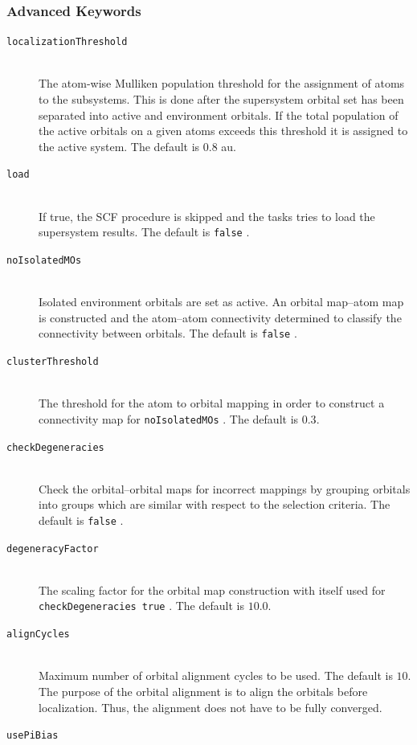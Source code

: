 \documentclass[bibliography=totocnumbered,a4paper,10pt,oneside]{scrbook}
\newcommand{\ttt}[1]{%
  \begingroup\setlength{\fboxsep}{1pt}%
  \colorbox{serenity-green!30}{\texttt{\hspace*{2pt}\vphantom{(g}#1\hspace*{2pt}}}%
  \endgroup
}
\begin{document}
\subsubsection{Advanced Keywords}
\begin{description}
    \item [\texttt{localizationThreshold}]\hfill \\
    The atom-wise Mulliken population threshold for the assignment of atoms to the subsystems. This is done
    after the supersystem orbital set has been separated into active and environment orbitals. If the total
    population of the active orbitals on a given atoms exceeds this threshold it is assigned to the active
    system. The default is $0.8$ au.
    \item [\texttt{load}]\hfill \\
    If true, the SCF procedure is skipped and the tasks tries to load the supersystem results. The default
    is \ttt{false}.
    \item [\texttt{noIsolatedMOs}]\hfill \\
    Isolated environment orbitals are set as active. An orbital map--atom map is constructed and the
    atom--atom connectivity determined to classify the connectivity between orbitals. The default is
    \ttt{false}.
    \item [\texttt{clusterThreshold}]\hfill \\
    The threshold for the atom to orbital mapping in order to construct a connectivity map for \ttt{noIsolatedMOs}. The default is $0.3$.
    \item [\texttt{checkDegeneracies}]\hfill \\
    Check the orbital--orbital maps for incorrect mappings by grouping orbitals into groups which are similar
    with respect to the selection criteria. The default is \ttt{false}.
    \item [\texttt{degeneracyFactor}]\hfill \\
    The scaling factor for the orbital map construction with itself used for
    \ttt{checkDegeneracies true}. The default is $10.0$.
    \item [\texttt{alignCycles}]\hfill \\
    Maximum number of orbital alignment cycles to be used. The default is $10$. The purpose of the orbital
    alignment is to align the orbitals before localization. Thus, the alignment does not have to be fully
    converged.
    \item [\texttt{usePiBias}]\hfill \\

\end{description}
\end{document}
